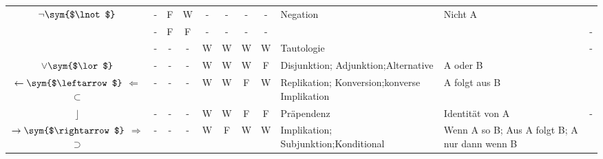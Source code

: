 \documentclass[english,ngerman,parskip=half,headsepline,footsepline,
	fleqn,notitlepage]{scrreprt}
\newcommand*{\texttrue}{W}%
\newcommand*{\textfalse}{F}%
\newcommand*{\lrep}{\leftarrow}%
\newcommand*{\lrepA}{\Leftarrow}%
\newcommand*{\lrepB}{\subset}%
\newcommand*{\lleft}{\operatorname{\rfloor}}%
\newcommand*{\limp}{\rightarrow}%
\newcommand*{\limpA}{\Rightarrow}%
\newcommand*{\limpB}{\supset}%
\newcommand*{\Sym}[1]{#1\sym{$#1$}}%
\begin{document}
\begin{table}
\begin{threeparttable}
\begin{tabularx}{\linewidth-10.95pt}{c||c:cc:cccc|X:X|c|}
				\tableline%

				$\Sym{\lnot}$
				& - & \textfalse & \texttrue  & - & - & - & -
				& Negation            & Nicht A          & \thepnot{} \\

				\tableline%

				& - & \textfalse & \textfalse & - & - & - & -
				&                     &                  & -                 \\

				\hline%

				~ & - & - & - &\texttrue&\texttrue&\texttrue&\texttrue
				& Tautologie
				&
				& - \\

				\tableline%


				$\Sym{\lor}$
				& - & - & - &\texttrue&\texttrue&\texttrue&\textfalse
				& Disjunktion; Adjunktion;\newline Alternative
				& A oder B
				& \thepor \\

				\tableline%

				$\Sym{\lrep}$ $\lrepA$ $\lrepB$
				& - & - & - &\texttrue&\texttrue&\textfalse&\texttrue
				& Replikation; Konversion;\newline konverse Implikation
				& A folgt aus B
				& \theprep \\

				\tableline%

				$\lleft$
				& - & - & - &\texttrue&\texttrue&\textfalse&\textfalse
				& Präpendenz
				& Identität von A
				& - \\

				\tablegroup%

				$\Sym{\limp}$ $\limpA$ $\limpB$
				& - & - & - &\texttrue&\textfalse&\texttrue&\texttrue
				& Implikation; Subjunktion;\newline Konditional
				& Wenn A so B; Aus A folgt B; A nur dann wenn B
				& \thepimp \\


\end{tabularx}
\end{threeparttable}
\end{table}
\end{document}

